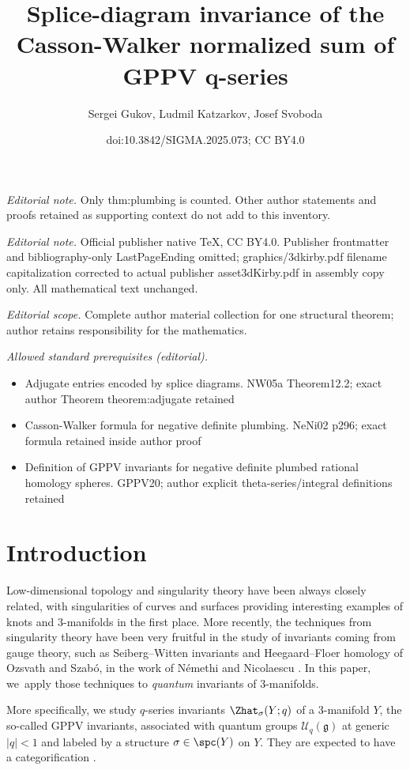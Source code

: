 \documentclass[10pt,a4paper]{amsart}
\title{Splice-diagram invariance of the Casson-Walker normalized sum of GPPV q-series}
\author{Sergei Gukov, Ludmil Katzarkov, Josef Svoboda}
\date{doi:10.3842/SIGMA.2025.073; CC BY4.0}
\begin{document}
\maketitle
\noindent\textit{Editorial note.} Only thm:plumbing is counted. Other author statements and proofs retained as supporting context do not add to this inventory.\par\medskip
\noindent\textit{Editorial note.} Official publisher native TeX, CC BY4.0. Publisher frontmatter and bibliography-only LastPageEnding omitted; graphics/3dkirby.pdf filename capitalization corrected to actual publisher asset3dKirby.pdf in assembly copy only. All mathematical text unchanged.\par\medskip
\noindent\textit{Editorial scope.} Complete author material collection for one structural theorem; author retains responsibility for the mathematics.\par\medskip
\noindent\textit{Allowed standard prerequisites (editorial).}\begin{itemize}
\item Adjugate entries encoded by splice diagrams. NW05a Theorem12.2; exact author Theorem theorem:adjugate retained
\item Casson-Walker formula for negative definite plumbing. NeNi02 p296; exact formula retained inside author proof
\item Definition of GPPV invariants for negative definite plumbed rational homology spheres. GPPV20; author explicit theta-series/integral definitions retained
\end{itemize}\medskip
\section{Introduction}\label{sec:intro}

Low-dimensional topology and singularity theory have been always closely related, with singularities of curves and surfaces providing interesting examples of knots and 3-manifolds in the first place. More recently, the techniques from singularity theory have been very fruitful in the study of invariants coming from gauge theory, such as Seiberg--Witten invariants and Heegaard--Floer homology of Ozsvath and Szab\'o, in the work of N\'emethi and Nicolaescu \cite{NeNi02}. In this paper, we~apply those techniques to \emph{quantum} invariants of 3-manifolds.

More specifically, we study $q$-series invariants $\Zhat_{\sigma}(Y; q)$ of a 3-manifold $Y$, the so-called GPPV invariants, associated with quantum groups $\mathcal{U}_q (\mathfrak{g})$ at generic $|q|<1$ and labeled by a \spc{} structure $\sigma \in \spc(Y)$ on $Y$. They are expected to have a categorification \cite{GPV16}.
\end{document}
